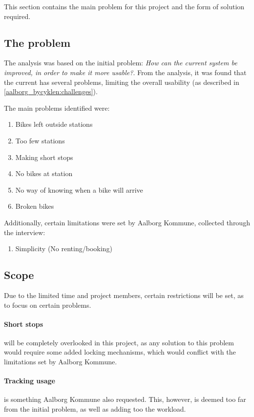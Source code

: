 This section contains the main problem for this project and the form of solution required.

\subsection{The problem}
The analysis was based on the initial problem: \textit{How can the current \citybike system be improved, in order to make it more usable?}.
From the analysis, it was found that the current \citybike has several problems, limiting the overall usability (as described in \cref{aalborg_bycyklen:challenges}).

The main problems identified were:
\begin{enumerate}
\item Bikes left outside stations
\item Too few stations
\item Making short stops
\item No bikes at station
\item No way of knowing when a bike will arrive
\item Broken bikes
\end{enumerate}

Additionally, certain limitations were set by Aalborg Kommune, collected through the interview:

\begin{enumerate}
\item Simplicity (No renting/booking)
\end{enumerate}

\subsection{Scope}
Due to the limited time and project members, certain restrictions will be set, as to focus on certain problems.

\paragraph{Short stops} will be completely overlooked in this project, as any solution to this problem would require some added locking mechanisms, which would conflict with the limitations set by Aalborg Kommune.

\paragraph{Tracking usage} is something Aalborg Kommune also requested.
This, however, is deemed too far from the initial problem, as well as adding too the workload.


